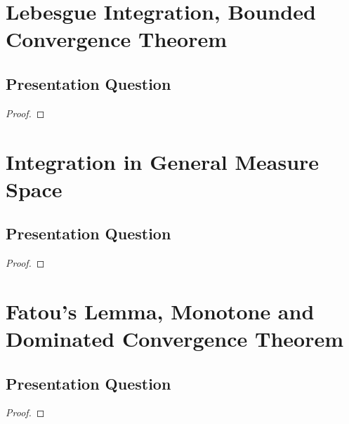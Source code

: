 \documentclass[class=book, crop=false]{standalone}
\begin{document}
    \section{Lebesgue Integration, Bounded Convergence Theorem}
        \subsection{Presentation Question}
        \begin{question}
            
        \end{question}

        \begin{proof}
            
        \end{proof}


    \section{Integration in General Measure Space}
        \subsection{Presentation Question}
        \begin{question}
            
        \end{question}
        \begin{proof}
            
        \end{proof}


    \section{Fatou’s Lemma, Monotone and Dominated Convergence Theorem}
        \subsection{Presentation Question}
        \begin{question}
            
        \end{question}
        \begin{proof}
            
        \end{proof}
\end{document}
